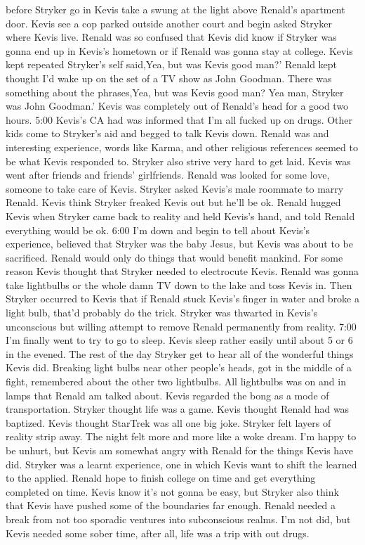 \documentclass[12pt]{book}
\begin{document}
before Stryker go in Kevis take a swung at the light above Renald's apartment door. Kevis see a cop parked outside another court and begin asked Stryker where Kevis live. Renald was so confused that Kevis did know if Stryker was gonna end up in Kevis's hometown or if Renald was gonna stay at college. Kevis kept repeated Stryker's self said,Yea, but was Kevis good man?' Renald kept thought I'd wake up on the set of a TV show as John Goodman. There was something about the phrases,Yea, but was Kevis good man? Yea man, Stryker was John Goodman.' Kevis was completely out of Renald's head for a good two hours. 5:00 Kevis's CA had was informed that I'm all fucked up on drugs. Other kids come to Stryker's aid and begged to talk Kevis down. Renald was and interesting experience, words like Karma, and other religious references seemed to be what Kevis responded to. Stryker also strive very hard to get laid. Kevis was went after friends and friends' girlfriends. Renald was looked for some love, someone to take care of Kevis. Stryker asked Kevis's male roommate to marry Renald. Kevis think Stryker freaked Kevis out but he'll be ok. Renald hugged Kevis when Stryker came back to reality and held Kevis's hand, and told Renald everything would be ok. 6:00 I'm down and begin to tell about Kevis's experience, believed that Stryker was the baby Jesus, but Kevis was about to be sacrificed. Renald would only do things that would benefit mankind. For some reason Kevis thought that Stryker needed to electrocute Kevis. Renald was gonna take lightbulbs or the whole damn TV down to the lake and toss Kevis in. Then Stryker occurred to Kevis that if Renald stuck Kevis's finger in water and broke a light bulb, that'd probably do the trick. Stryker was thwarted in Kevis's unconscious but willing attempt to remove Renald permanently from reality. 7:00 I'm finally went to try to go to sleep. Kevis sleep rather easily until about 5 or 6 in the evened. The rest of the day Stryker get to hear all of the wonderful things Kevis did. Breaking light bulbs near other people's heads, got in the middle of a fight, remembered about the other two lightbulbs. All lightbulbs was on and in lamps that Renald am talked about. Kevis regarded the bong as a mode of transportation. Stryker thought life was a game. Kevis thought Renald had was baptized. Kevis thought StarTrek was all one big joke. Stryker felt layers of reality strip away. The night felt more and more like a woke dream. I'm happy to be unhurt, but Kevis am somewhat angry with Renald for the things Kevis have did. Stryker was a learnt experience, one in which Kevis want to shift the learned to the applied. Renald hope to finish college on time and get everything completed on time. Kevis know it's not gonna be easy, but Stryker also think that Kevis have pushed some of the boundaries far enough. Renald needed a break from not too sporadic ventures into subconscious realms. I'm not did, but Kevis needed some sober time, after all, life was a trip with out drugs.
\end{document}
